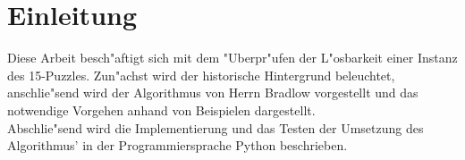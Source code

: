 \chapter{Einleitung}
Diese Arbeit besch"aftigt sich mit dem "Uberpr"ufen der L"osbarkeit einer Instanz des 15-Puzzles. Zun"achst wird der historische Hintergrund beleuchtet, anschlie"send wird der Algorithmus von Herrn Bradlow vorgestellt und das notwendige Vorgehen anhand von Beispielen dargestellt.\\
Abschlie"send wird die Implementierung und das Testen der Umsetzung des Algorithmus' in der Programmiersprache Python beschrieben.



